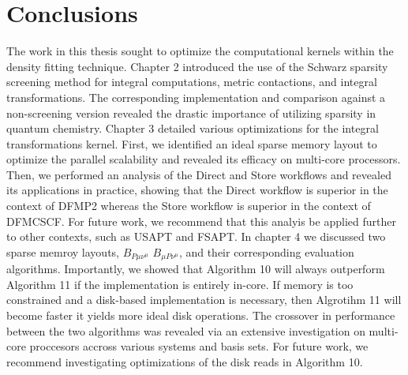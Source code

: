 \chapter{Conclusions}

The work in this thesis sought to optimize the computational kernels within the density fitting technique.
Chapter 2 introduced the use of the Schwarz sparsity screening method for integral computations, metric contactions, and integral transformations.
The corresponding implementation and comparison against a non-screening version revealed the drastic importance of 
utilizing sparsity in quantum chemistry.
Chapter 3 detailed various optimizations for the integral transformations kernel. First, we identified an ideal sparse memory layout to 
optimize the parallel scalability and revealed its efficacy on multi-core processors. Then, we performed an analysis of 
the Direct and Store workflows and revealed its applications in practice, showing that the Direct workflow is superior in 
the context of DFMP2 whereas the Store workflow is superior in the context of DFMCSCF. 
For future work, we recommend that this analyis be applied further to other contexts, such as
USAPT and FSAPT. In chapter 4 we discussed two sparse memroy layouts, $B_{P \mu \nu^{\mu}}$ $B_{\mu P \nu^{\mu}}$, and their corresponding
evaluation algorithms. Importantly, we showed that Algorithm 10 will always outperform Algorithm 11 if the implementation is entirely in-core.
If memory is too constrained and a disk-based implementation is necessary, then Algrotihm 11 will become faster 
it yields more ideal disk operations. The crossover in performance between the two algorithms was revealed via an extensive investigation on
multi-core proccesors accross various systems and basis sets. For future work, we recommend investigating optimizations of the disk reads
in Algorithm 10. 


